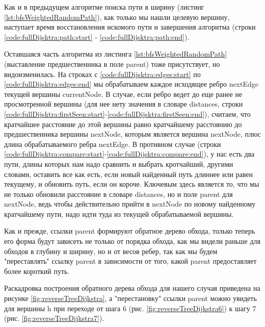 \documentclass[../article.tex]{subfiles}
\begin{document}
Как и в предыдущем алгоритме поиска пути в ширину (листинг \ref{lst:bfsWeightedRandomPath}), как только мы нашли целевую вершину, наступает время восстановления искомого пути и завершения алгоритма (строки \ref{code:fullDijsktra:path:start} - \ref{code:fullDijsktra:path:end}).

Оставшаяся часть алгоритма из листинга \ref{lst:bfsWeightedRandomPath} (выставление предшественника в поле {\firacodebold parent}) тоже присутствует, но видоизменилась. На строках с \ref{code:fullDijsktra:edges:start} по \ref{code:fullDijsktra:edges:end} мы обрабатываем каждое исходящее ребро {\firacodebold nextEdge} текущей вершины {\firacodebold currentNode}. В случае, если ребро ведет до еще ранее не просмотренной вершины (для нее нету значения в словаре {\firacodebold distances}, строки \ref{code:fullDijsktra:firstSeen:start}-\ref{code:fullDijsktra:firstSeen:end}), считаем, что кратчайшее расстояние до этой вершины равно кратчайшему расстоянию до предшественника вершины {\firacodebold nextNode}, которым является вершина {\firacodebold nextNode}, плюс длина обрабатываемого ребра {\firacodebold nextEdge}. В противном случае (строки \ref{code:fullDijsktra:compare:start}-\ref{code:fullDijsktra:compare:end}), у нас есть два пути, длины которых нам надо сравнить и выбрать кротчайший, другими словами, оставить все как есть, если новый найденный путь длиннее или равен текущему, и обновить путь, если он короче. Ключевым здесь является то, что мы не только обновили расстояние в словаре {\firacodebold distances}, но и поле {\firacodebold parent} для {\firacodebold nextNode}, ведь чтобы действительно прийти в nextNode по новому найденному кратчайшему пути, надо идти туда из текущей обрабатываемой вершины.

Как и прежде, ссылки {\firacodebold parent} формируют обратное дерево обхода, только теперь его форма будут зависеть не только от порядка обхода, как мы видели раньше для обходов в глубину и ширину, но и от весов ребер, так как мы будем "переставлять" ссылку {\firacodebold parent} в зависимости от того, какой {\firacodebold parent} предоставляет более короткий путь.

Раскадровка построения обратного дерева обхода для нашего случая приведена на рисунке \ref{fig:reverseTreeDijkstra}, а "перестановку" ссылки parent можно увидеть для вершины h при переходе от шага 6 (рис. \ref{fig:reverseTreeDijkstra6}) к шагу 7 (рис. \ref{fig:reverseTreeDijkstra7}).
\end{document}
